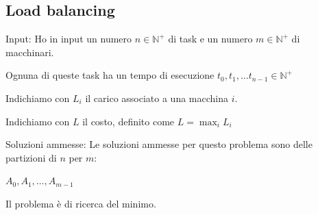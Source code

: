 \subsection{Load balancing}

    \begin{paragrafo}{Input:}
        Ho in input un numero $n \in \mathbb{N}^+$ di task e un numero $m \in \mathbb{N}^+$ di macchinari.

        Ognuna di queste task ha un tempo di esecuzione $t_0,t_1,\dots t_{n-1} \in \mathbb{N}^+$

        Indichiamo con $L_i$ il carico associato a una macchina $i$.

        Indichiamo con $L$ il costo, definito come  $L = \max_i{L_i}$
    \end{paragrafo}

    \begin{paragrafo}{Soluzioni ammesse:}
        Le soluzioni ammesse per questo problema sono delle partizioni di $n$ per $m$:

        \begin{center}
            $A_0,A_1,\dots ,A_{m-1}$
        \end{center}

        Il problema è di ricerca del minimo.
    \end{paragrafo}

